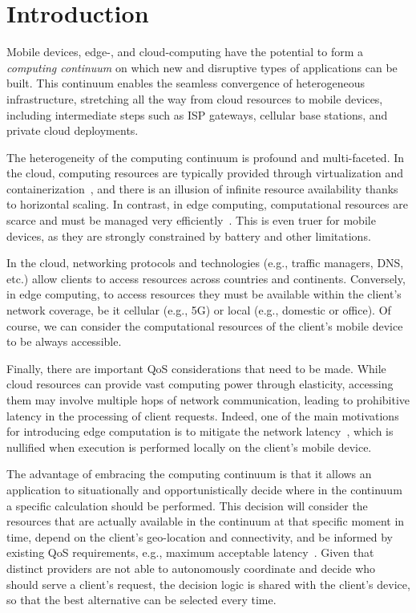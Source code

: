 \section{Introduction}
\label{sec:intro}

Mobile devices, edge-, and cloud-computing have the potential to form a \textit{computing continuum} on which new and disruptive types of applications can be built. This continuum enables the seamless convergence of heterogeneous infrastructure, stretching all the way from cloud resources to mobile devices, including intermediate steps such as ISP gateways, cellular base stations, and private cloud deployments.

The heterogeneity of the computing continuum is profound and multi-faceted. In the cloud, computing resources are typically provided through virtualization and containerization~\cite{leitner2016patterns, Quatrocchi2016discrete}, and there is an illusion of infinite resource availability thanks to horizontal scaling. In contrast, in edge computing, computational resources are scarce and must be managed very efficiently~\cite{Dehos14millimeter5g,GarrigaMendonca2017}. This is even truer for mobile devices, as they are strongly constrained by battery and other limitations. 

In the cloud, networking protocols and technologies (e.g., traffic managers, DNS, etc.) allow clients to access resources across countries and continents. Conversely, in edge computing, to access resources they must be available within the client's network coverage, be it cellular (e.g., 5G) or local (e.g., domestic or office). Of course, we can consider the computational resources of the client's mobile device to be always accessible. %

Finally, there are important QoS considerations that need to be made. While cloud resources can provide vast computing power through elasticity, accessing them may involve multiple hops of network communication, leading to prohibitive latency in the processing of client requests. Indeed, one of the main motivations for introducing edge computation is to mitigate the network latency~\cite{Shi:2016}, which is nullified when execution is performed locally on the client's mobile device.

The advantage of embracing the computing continuum is that it allows an application to situationally and opportunistically decide where in the continuum a specific calculation should be performed. This decision will consider the resources that are actually available in the continuum at that specific moment in time, depend on the client's geo-location and connectivity, and be informed by existing QoS requirements, e.g., maximum acceptable latency~\cite{GuptaIfogSim17}. Given that distinct providers are not able to autonomously coordinate and decide who should serve a client's request, the decision logic is shared with the client's device, so that the best alternative can be selected every time.


